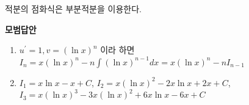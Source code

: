 \documentclass[a4paper,11pt]{article}
\begin{document}
\begin{studybox}
적분의 점화식은 부분적분을 이용한다.
\end{studybox}

\textbf{모범답안}
\begin{enumerate}[label=(\arabic*)]
    \item $u^{\prime}=1, v=(\ln x)^{n}$ 이라 하면 $I_{n}=x(\ln x)^{n}-n\int(\ln x)^{n-1}dx = x(\ln x)^{n}-nI_{n-1}$
    \item $I_{1}=x\ln x-x+C$, $I_{2}=x(\ln x)^{2}-2x\ln x+2x+C$, $I_{3}=x(\ln x)^{3}-3x(\ln x)^{2}+6x\ln x-6x+C$
\end{enumerate}
\end{document}
